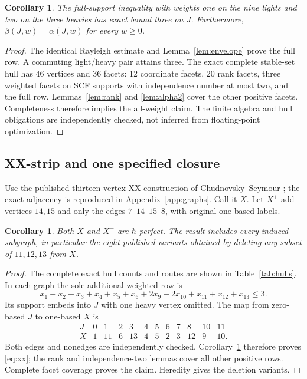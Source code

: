 \documentclass[11pt,a4paper]{article}
\newtheorem{corollary}[theorem]{Corollary}
\theoremstyle{remark}\newtheorem{remark}[theorem]{Remark}
\begin{document}
\begin{corollary}\label{cor:J}
The full-support inequality with weights one on the nine lights and
two on the three heavies has exact bound three on $J$. Furthermore,
$\beta(J,w)=\alpha(J,w)$ for every $w\geq0$.
\end{corollary}
\begin{proof}
The identical Rayleigh estimate and Lemma~\ref{lem:envelope} prove the
full row. A commuting light/heavy pair attains three. The exact complete
stable-set hull has 46 vertices and 36 facets: 12 coordinate facets,
20 rank facets, three weighted facets on SCF supports with independence
number at most two, and the full row. Lemmas~\ref{lem:rank} and
\ref{lem:alpha2} cover the other positive facets. Completeness therefore
implies the all-weight claim. The finite algebra and hull obligations
are independently checked, not inferred from floating-point optimization.
\end{proof}

\subsection{XX-strip and one specified closure}
Use the published thirteen-vertex XX construction of
Chudnovsky--Seymour \cite{cs}; the exact adjacency is reproduced in
Appendix~\ref{app:graphs}. Call it $X$. Let $X^+$ add vertices $14,15$
and only the edges $7$--$14$--$15$--$8$, with original one-based labels.

\begin{corollary}\label{cor:XX}
Both $X$ and $X^+$ are $\hbar$-perfect. The result includes every
induced subgraph, in particular the eight published variants obtained
by deleting any subset of $11,12,13$ from $X$.
\end{corollary}
\begin{proof}
The complete exact hull counts and routes are shown in
Table~\ref{tab:hulls}. In each graph the sole additional weighted row is
\begin{equation}\label{eq:xx}
 x_1+x_2+x_3+x_4+x_5+x_6+2x_9+2x_{10}+x_{11}+x_{12}+x_{13}\leq3.
\end{equation}
Its support embeds into $J$ with one heavy vertex omitted. The map from
zero-based $J$ to one-based $X$ is
\[
\begin{array}{c|rrrrrrrrrrr}
J&0&1&2&3&4&5&6&7&8&10&11\\\hline
X&1&11&6&13&4&5&2&3&12&9&10.
\end{array}
\]
Both edges and nonedges are independently checked. Corollary~\ref{cor:J}
therefore proves \eqref{eq:xx}; the rank and independence-two lemmas
cover all other positive rows. Complete facet coverage proves the
claim. Heredity gives the deletion variants.
\end{proof}
\end{document}
